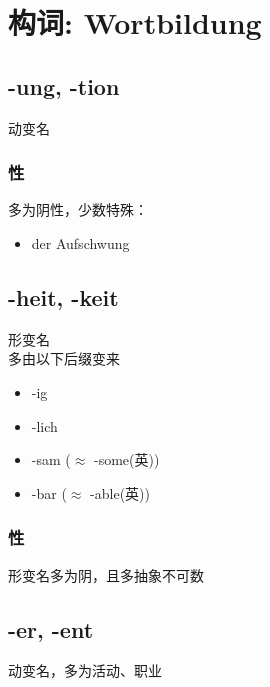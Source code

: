 \chapter{构词: Wortbildung}

\section{-ung, -tion}
动变名
\subsection{性}
多为阴性，少数特殊：
\begin{itemize}
    \item der Aufschwung
\end{itemize}

\section{-heit, -keit}
形变名 \\
多由以下后缀变来
\begin{itemize}
    \item -ig
    \item -lich
    \item -sam ($\approx$ -some(英))
    \item -bar ($\approx$ -able(英))
\end{itemize}
\subsection{性}
形变名多为阴，且多抽象不可数

\section{-er, -ent}
动变名，多为活动、职业

